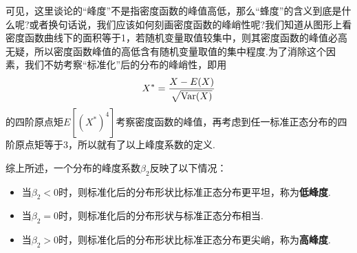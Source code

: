 可见，这里谈论的“峰度”不是指密度函数的峰值高低，那么“蜂度”的含义到底是什么呢?或者换句话说，我们应该如何刻画密度函数的峰峭性呢?我们知道从图形上看密度函数曲线下的面积等于1，若随机变量取值较集中，则其密度函数的峰值必高无疑，所以密度函数峰值的高低含有随机变量取值的集中程度.为了消除这个因素，我们不妨考察“标准化”后的分布的峰峭性，即用
\[ X^\ast = \frac{X - E(X)} {\sqrt{\operatorname{Var}(X)}} \]
的四阶原点矩$E[(X^\ast)^4]$考察密度函数的峰值，再考虑到任一标准正态分布的四阶原点矩等于3，所以就有了以上峰度系数的定义.

综上所述，一个分布的峰度系数$\beta_2$反映了以下情况：
\begin{itemize}
    \item 当$\beta_2<0$时，则标准化后的分布形状比标准正态分布更平坦，称为\textbf{低峰度}.
    \item 当$\beta_2=0$时，则标准化后的分布形状与标准正态分布相当.
    \item 当$\beta_2>0$时，则标准化后的分布形状比标准正态分布更尖峭，称为\textbf{高峰度}.
\end{itemize}


